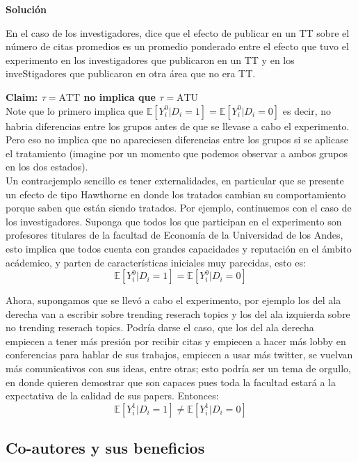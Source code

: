\documentclass[a4paper, answers, addpoints, 11pt]{exam}
\newenvironment{solucion}{%
  \begin{mdframed}[
    backgroundcolor=blue!5,    %
    linecolor=blue!50,          %
    linewidth=2pt,              %
    leftmargin=10pt,            %
    rightmargin=8pt,           %
    topline=true,              %
    bottomline=true,            %
    roundcorner=10pt,           %
    innerleftmargin=10pt,       %
    innerrightmargin=10pt,      %
    innerbottommargin=10pt,     %
    innertopmargin=10pt         %
  ]%
  \begin{tcolorbox}[colframe=blue!50!black, colback=blue!50, coltitle=white, sharp corners=all, boxrule=1mm, width=\textwidth, halign=left, valign=center, top=0mm, bottom=0mm, left=0mm, right=0mm] \textbf{Solución} \end{tcolorbox} }{\end{mdframed}}
\begin{document}
\begin{solucion}
\begin{itemize}
      En el caso de los investigadores, dice que el efecto de publicar en un TT sobre el número de citas promedios es un promedio ponderado entre el efecto que tuvo el experimento en los investigadores que publicaron en un TT y en los inveStigadores que publicaron en otra área que no era TT. 
 \end{itemize}
      

      
\textbf{Claim: $\tau = \text{ATT}$ no implica que $\tau = \text{ATU}$ }\\
Note que lo primero implica que $\mathbb{E}[Y^{0}_{i}|D_i=1]=\mathbb{E}[Y^{0}_{i}|D_i=0]$ es decir, no habria diferencias entre los grupos antes de que se llevase a cabo el experimento. Pero eso no implica que no apareciesen diferencias entre los grupos si se aplicase el tratamiento (imagine por un momento que podemos observar a ambos grupos en los dos estados). \\

Un contraejemplo sencillo es tener externalidades, en particular que se presente un efecto de tipo Hawthorne en donde los tratados cambian su comportamiento porque saben que están siendo tratados. Por ejemplo, continuemos con el caso de los investigadores. Suponga que todos los que participan en el experimento son profesores titulares de la facultad de Economía de la Universidad de los Andes, esto implica que todos cuenta con grandes capacidades y reputación en el ámbito acádemico, y parten de características iniciales muy parecidas, esto es:
$$\mathbb{E}[Y^{0}_{i}|D_i=1]=\mathbb{E}[Y^{0}_{i}|D_i=0] $$

Ahora, supongamos que se llevó a cabo el experimento, por ejemplo los del ala derecha van a escribir sobre trending reserach topics y los del ala izquierda sobre no trending reserach topics. Podría darse el caso, que los del ala derecha empiecen a tener más presión por recibir citas y empiecen a hacer más lobby en conferencias para hablar de sus trabajos, empiecen a usar más twitter, se vuelvan más comunicativos con sus ideas, entre otras; esto podría ser un tema de orgullo, en donde quieren demostrar que son capaces pues toda la facultad estará a la expectativa de la calidad de sus papers. Entonces:
$$\mathbb{E}[Y^{1}_{i}|D_i=1] \neq \mathbb{E}[Y^{1}_{i}|D_i=0] $$

        \end{solucion}

\subsection*{Co-autores y sus beneficios}
\end{document}
